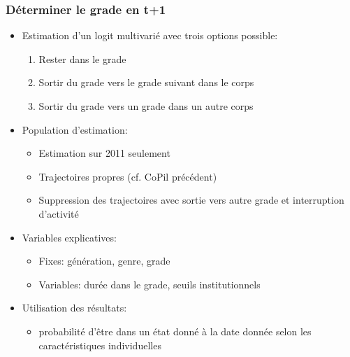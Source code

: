 \documentclass[xcolor=table,ignorenonframetext,12pt]{beamer}
\begin{document}
\begin{frame}
\frametitle{Déterminer le grade en t+1}
\begin{itemize}
\item Estimation d'un logit multivarié avec trois options possible: 
	\begin{enumerate}
	\item Rester dans le grade
	\item Sortir du grade vers le grade suivant dans le corps
	\item Sortir du grade vers un grade dans un autre corps
	\end{enumerate}

\vspace{0.1cm}	
\item Population d'estimation:
 	\begin{itemize}
	\item Estimation sur 2011 seulement 
	\item Trajectoires propres (cf. CoPil précédent)
	\item Suppression des trajectoires avec sortie vers autre grade et interruption d'activité
 	\end{itemize}

\vspace{0.1cm}		
\item Variables explicatives:
     \begin{itemize}
     \item Fixes: génération, genre, grade
     \item Variables: durée dans le grade, seuils institutionnels
     \end{itemize}

\vspace{0.1cm}	
\item Utilisation des résultats:
     \begin{itemize}
     \item probabilité d'être dans un état donné à la date donnée selon les caractéristiques individuelles
     \end{itemize}


\end{itemize}


\end{frame}
\end{document}
